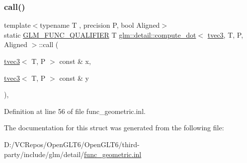 \subsubsection{\texorpdfstring{call()}{call()}}
{\footnotesize\ttfamily template$<$typename T , precision P, bool Aligned$>$ \\
static \mbox{\hyperlink{setup_8hpp_a33fdea6f91c5f834105f7415e2a64407}{G\+L\+M\+\_\+\+F\+U\+N\+C\+\_\+\+Q\+U\+A\+L\+I\+F\+I\+ER}} T \mbox{\hyperlink{structglm_1_1detail_1_1compute__dot}{glm\+::detail\+::compute\+\_\+dot}}$<$ \mbox{\hyperlink{structglm_1_1tvec3}{tvec3}}, T, P, Aligned $>$\+::call (\begin{DoxyParamCaption}\item[{\mbox{\hyperlink{structglm_1_1tvec3}{tvec3}}$<$ T, P $>$ const \&}]{x,  }\item[{\mbox{\hyperlink{structglm_1_1tvec3}{tvec3}}$<$ T, P $>$ const \&}]{y }\end{DoxyParamCaption})\hspace{0.3cm}{\ttfamily [inline]}, {\ttfamily [static]}}



Definition at line 56 of file func\+\_\+geometric.\+inl.



The documentation for this struct was generated from the following file\+:\begin{DoxyCompactItemize}
\item 
D\+:/\+V\+C\+Repos/\+Open\+G\+L\+T6/\+Open\+G\+L\+T6/third-\/party/include/glm/detail/\mbox{\hyperlink{func__geometric_8inl}{func\+\_\+geometric.\+inl}}\end{DoxyCompactItemize}
